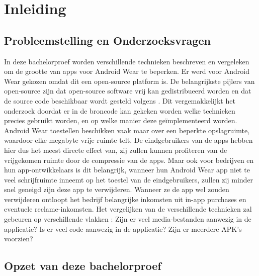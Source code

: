 
\chapter{Inleiding}
\label{ch:inleiding}

\section{Probleemstelling en Onderzoeksvragen}
\label{sec:onderzoeksvragen}

In deze bachelorproef worden verschillende technieken beschreven en vergeleken om de grootte van apps voor Android Wear te beperken. Er werd voor Android Wear gekozen omdat dit een open-source platform is. De belangrijkste pijlers van open-source zijn dat open-source software vrij kan gedistribueerd worden en dat de source code beschikbaar wordt gesteld volgens \textcite{Open Source Initiative} . Dit vergemakkelijkt het onderzoek doordat er in de broncode kan gekeken worden welke technieken precies gebruikt worden, en op welke manier deze geïmplementeerd worden. Android Wear toestellen beschikken vaak maar over een beperkte opslagruimte, waardoor elke megabyte vrije ruimte telt. De eindgebruikers van de apps hebben hier dus het meest directe effect van, zij zullen kunnen profiteren van de vrijgekomen ruimte door de compressie van de apps. Maar ook voor bedrijven en hun app-ontwikkelaars is dit belangrijk, wanneer hun Android Wear app niet te veel schrijfruimte inneemt op het toestel van de eindgebruikers, zullen zij minder snel geneigd zijn deze app te verwijderen. Wanneer ze de app wel zouden verwijderen ontloopt het bedrijf belangrijke inkomsten uit in-app purchases en eventuele reclame-inkomsten. Het vergelijken van de verschillende technieken zal gebeuren op verschillende vlakken : Zijn er veel media-bestanden aanwezig in de applicatie? Is er veel code aanwezig in de applicatie? Zijn er meerdere APK's voorzien?

\section{Opzet van deze bachelorproef}
\label{sec:opzet-bachelorproef}

